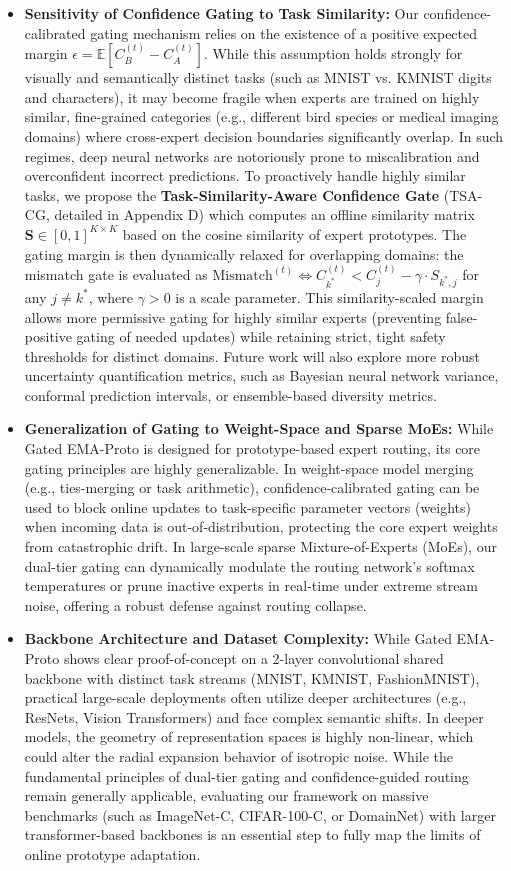 \documentclass{article}
\theoremstyle{plain}
\theoremstyle{definition}
\theoremstyle{remark}
\begin{document}
\begin{itemize}
    \item \textbf{Sensitivity of Confidence Gating to Task Similarity:} Our confidence-calibrated gating mechanism relies on the existence of a positive expected margin $\epsilon = \mathbb{E}[C_B^{(t)} - C_A^{(t)}]$. While this assumption holds strongly for visually and semantically distinct tasks (such as MNIST vs. KMNIST digits and characters), it may become fragile when experts are trained on highly similar, fine-grained categories (e.g., different bird species or medical imaging domains) where cross-expert decision boundaries significantly overlap. In such regimes, deep neural networks are notoriously prone to miscalibration and overconfident incorrect predictions. To proactively handle highly similar tasks, we propose the \textbf{Task-Similarity-Aware Confidence Gate} (TSA-CG, detailed in Appendix D) which computes an offline similarity matrix $\mathbf{S} \in [0, 1]^{K \times K}$ based on the cosine similarity of expert prototypes. The gating margin is then dynamically relaxed for overlapping domains: the mismatch gate is evaluated as $\text{Mismatch}^{(t)} \iff C_{k^*}^{(t)} < C_j^{(t)} - \gamma \cdot S_{k^*, j}$ for any $j \neq k^*$, where $\gamma > 0$ is a scale parameter. This similarity-scaled margin allows more permissive gating for highly similar experts (preventing false-positive gating of needed updates) while retaining strict, tight safety thresholds for distinct domains. Future work will also explore more robust uncertainty quantification metrics, such as Bayesian neural network variance, conformal prediction intervals, or ensemble-based diversity metrics.
    \item \textbf{Generalization of Gating to Weight-Space and Sparse MoEs:} While Gated EMA-Proto is designed for prototype-based expert routing, its core gating principles are highly generalizable. In weight-space model merging (e.g., ties-merging or task arithmetic), confidence-calibrated gating can be used to block online updates to task-specific parameter vectors (weights) when incoming data is out-of-distribution, protecting the core expert weights from catastrophic drift. In large-scale sparse Mixture-of-Experts (MoEs), our dual-tier gating can dynamically modulate the routing network's softmax temperatures or prune inactive experts in real-time under extreme stream noise, offering a robust defense against routing collapse.
    \item \textbf{Backbone Architecture and Dataset Complexity:} While Gated EMA-Proto shows clear proof-of-concept on a 2-layer convolutional shared backbone with distinct task streams (MNIST, KMNIST, FashionMNIST), practical large-scale deployments often utilize deeper architectures (e.g., ResNets, Vision Transformers) and face complex semantic shifts. In deeper models, the geometry of representation spaces is highly non-linear, which could alter the radial expansion behavior of isotropic noise. While the fundamental principles of dual-tier gating and confidence-guided routing remain generally applicable, evaluating our framework on massive benchmarks (such as ImageNet-C, CIFAR-100-C, or DomainNet) with larger transformer-based backbones is an essential step to fully map the limits of online prototype adaptation.
\end{itemize}
\end{document}
